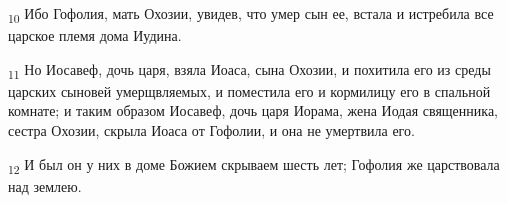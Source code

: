 \begin{tcolorbox}
\textsubscript{10} Ибо Гофолия, мать Охозии, увидев, что умер сын ее, встала и истребила все царское племя дома Иудина.
\end{tcolorbox}
\begin{tcolorbox}
\textsubscript{11} Но Иосавеф, дочь царя, взяла Иоаса, сына Охозии, и похитила его из среды царских сыновей умерщвляемых, и поместила его и кормилицу его в спальной комнате; и таким образом Иосавеф, дочь царя Иорама, жена Иодая священника, сестра Охозии, скрыла Иоаса от Гофолии, и она не умертвила его.
\end{tcolorbox}
\begin{tcolorbox}
\textsubscript{12} И был он у них в доме Божием скрываем шесть лет; Гофолия же царствовала над землею.
\end{tcolorbox}

